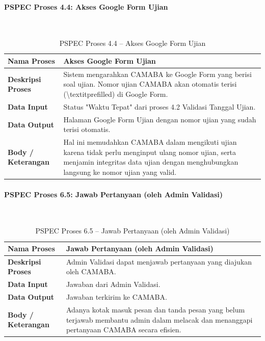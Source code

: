 \paragraph{PSPEC Proses 4.4: Akses Google Form Ujian}~\\
\begin{longtable}{|p{}|p{}|}
	\caption{PSPEC Proses 4.4 -- Akses Google Form Ujian}
	\label{table:3.pspec44}\\
	\hline
	\textbf{Nama Proses} & Akses Google Form Ujian \\
	\hline
	\textbf{Deskripsi Proses} & Sistem mengarahkan CAMABA ke Google Form yang berisi soal ujian. Nomor ujian CAMABA akan otomatis terisi (\textbackslash{}textit{prefilled}) di Google Form. \\
	\hline
	\textbf{Data Input} & Status "Waktu Tepat" dari proses 4.2 Validasi Tanggal Ujian. \\
	\hline
	\textbf{Data Output} & Halaman Google Form Ujian dengan nomor ujian yang sudah terisi otomatis. \\
	\hline
	\textbf{Body / Keterangan} & Hal ini memudahkan CAMABA dalam mengikuti ujian karena tidak perlu menginput ulang nomor ujian, serta menjamin integritas data ujian dengan menghubungkan langsung ke nomor ujian yang valid. \\
	\hline
\end{longtable}

\paragraph{PSPEC Proses 6.5: Jawab Pertanyaan (oleh Admin Validasi)}~\\
\begin{longtable}{|p{}|p{}|}
	\caption{PSPEC Proses 6.5 -- Jawab Pertanyaan (oleh Admin Validasi)}
	\label{table:3.pspec65}\\
	\hline
	\textbf{Nama Proses} & Jawab Pertanyaan (oleh Admin Validasi) \\
	\hline
	\textbf{Deskripsi Proses} & Admin Validasi dapat menjawab pertanyaan yang diajukan oleh CAMABA. \\
	\hline
	\textbf{Data Input} & Jawaban dari Admin Validasi. \\
	\hline
	\textbf{Data Output} & Jawaban terkirim ke CAMABA. \\
	\hline
	\textbf{Body / Keterangan} & Adanya kotak masuk pesan dan tanda pesan yang belum terjawab membantu admin dalam melacak dan menanggapi pertanyaan CAMABA secara efisien. \\
	\hline
\end{longtable}

